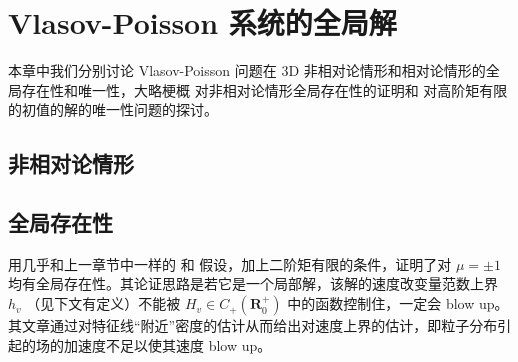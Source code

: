 \chapter{Vlasov-Poisson 系统的全局解}





本章中我们分别讨论 Vlasov-Poisson 问题在 3D 非相对论情形和相对论情形的全局存在性和唯一性，大略梗概 \cite*{pfaffelmoser_global_1992} 对非相对论情形全局存在性的证明和 \cite*{1991InMat.105..415L} 对高阶矩有限的初值的解的唯一性问题的探讨。


\section{非相对论情形}
\label{cha:global-VP}


\section{全局存在性}

\cite*{pfaffelmoser_global_1992} 用几乎和上一章节中一样的 \supremumf 和 \lipOffVsphere 假设，加上二阶矩有限的条件，证明了对 $ \mu=\pm 1$ 均有全局存在性。其论证思路是若它是一个局部解，该解的速度改变量范数上界 $h_v$ （见下文有定义）不能被 $H_{v} \in C_{+}\left(\mathbf{R}_{0}^{+}\right)$ 中的函数控制住，一定会 blow up。其文章通过对特征线“附近”密度的估计从而给出对速度上界的估计，即粒子分布引起的场的加速度不足以使其速度 blow up。



